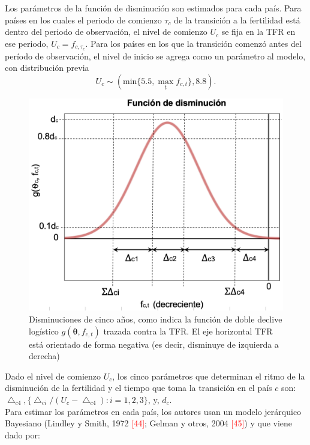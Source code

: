 Los parámetros de la función de disminución son estimados para cada país. Para países en los cuales el periodo de comienzo $\tau_{c}$ de la transición a la fertilidad está dentro del periodo de observación, el nivel de comienzo $U_{c}$ se fija en la TFR en ese periodo, $U_{c}=f_{c,\tau_{c}}$. Para los países en los que la transición comenzó antes del período de observación, el nivel de inicio se agrega como un parámetro al modelo, con distribución previa $$U_{c}\sim(\text{min}\{5.5,\operatorname*{max}_t f_{c,t}\},8.8).$$

\vspace{-0.3cm}
\begin{figure}[!ht]
\centering
\includegraphics[scale=0.4]{Cap2/decline.png}
\captionsetup{width=0.94\linewidth}
\caption[Disminuciones de cinco años dadas por la función logística doble]{Disminuciones de cinco años, como indica la función de doble declive logístico $g(\boldsymbol{\theta},f_{c,t})$ trazada contra la TFR. El eje horizontal TFR está orientado de forma negativa (es decir, disminuye de izquierda a derecha)}
\end{figure}
Dado el nivel de comienzo $U_{c}$, los cinco parámetros  que determinan el ritmo de la disminución de la fertilidad y el tiempo que toma la transición en el país $c$ son: $\bigtriangleup_{c4}, \{\bigtriangleup_{ci}/(U_{c}-\bigtriangleup_{c4}):i=1,2,3\}$, y, $d_{c}$.\\
Para estimar los parámetros en cada país, los autores usan un modelo jerárquico Bayesiano (Lindley y Smith, 1972 \textcolor{red}{[44]}; Gelman y otros, 2004 \textcolor{red}{[45]}) y que viene dado por:

